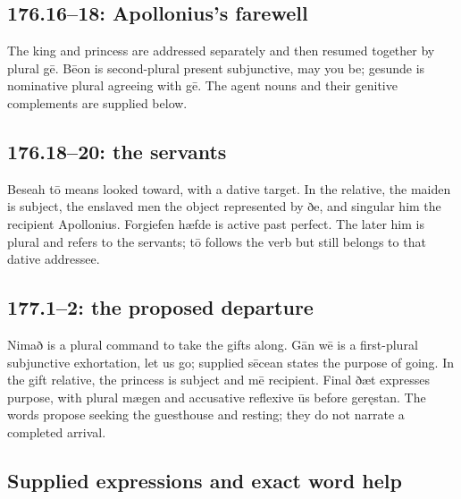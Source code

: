 \subsection*{176.16–18: Apollonius’s farewell}

The king and princess are addressed separately and then resumed together by plural gē. Bēon is second-plural present subjunctive, may you be; gesunde is nominative plural agreeing with gē. The agent nouns and their genitive complements are supplied below.

\subsection*{176.18–20: the servants}

Beseah tō means looked toward, with a dative target. In the relative, the maiden is subject, the enslaved men the object represented by ðe, and singular him the recipient Apollonius. Forgiefen hæfde is active past perfect. The later him is plural and refers to the servants; tō follows the verb but still belongs to that dative addressee.

\subsection*{177.1–2: the proposed departure}

Nimað is a plural command to take the gifts along. Gān wē is a first-plural subjunctive exhortation, let us go; supplied sēcean states the purpose of going. In the gift relative, the princess is subject and mē recipient. Final ðæt expresses purpose, with plural mægen and accusative reflexive ūs before geręstan. The words propose seeking the guesthouse and resting; they do not narrate a completed arrival.

\subsection*{Supplied expressions and exact word help}

